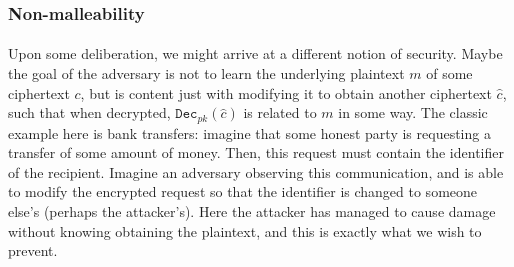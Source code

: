 \documentclass{article}
\theoremstyle{definition}
\newcommand{\Dec}{\texttt{Dec}}
\begin{document}
\subsubsection{Non-malleability}
\paragraph{} Upon some deliberation, we might arrive at a different notion of
security. Maybe the goal of the adversary is not to learn the underlying
plaintext $m$ of some ciphertext $c$, but is content just with modifying it to
obtain another ciphertext $\hat{c}$, such that when decrypted,
$\Dec_{pk}(\hat{c})$ is related to $m$ in some way. The classic example here is
bank transfers: imagine that some honest party is requesting a transfer of some
amount of money. Then, this request must contain the identifier of the
recipient. Imagine an adversary observing this communication, and is able to
modify the encrypted request so that the identifier is changed to someone else's
(perhaps the attacker's). Here the attacker has managed to cause damage without
knowing obtaining the plaintext, and this is exactly what we wish to prevent.
\end{document}
